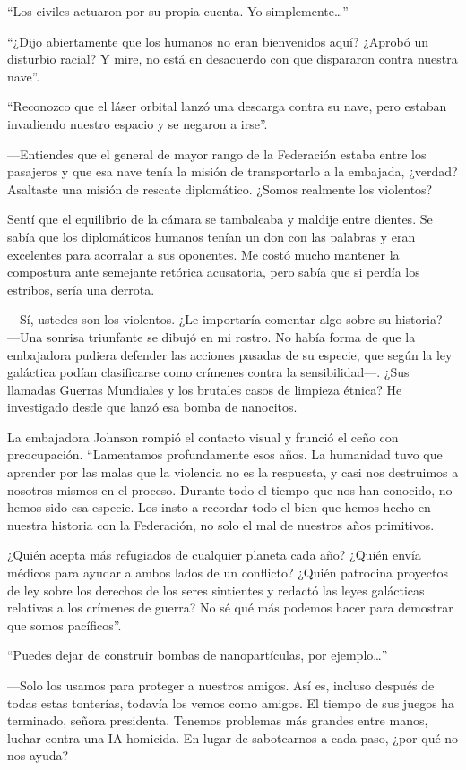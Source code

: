 ``Los civiles actuaron por su propia cuenta. Yo simplemente…''

``¿Dijo abiertamente que los humanos no eran bienvenidos aquí? ¿Aprobó un disturbio racial? Y mire, no está en desacuerdo con que dispararon contra nuestra nave''.

``Reconozco que el láser orbital lanzó una descarga contra su nave, pero estaban invadiendo nuestro espacio y se negaron a irse''.

—Entiendes que el general de mayor rango de la Federación estaba entre los pasajeros y que esa nave tenía la misión de transportarlo a la embajada, ¿verdad? Asaltaste una misión de rescate diplomático. ¿Somos realmente los violentos?

Sentí que el equilibrio de la cámara se tambaleaba y maldije entre dientes. Se sabía que los diplomáticos humanos tenían un don con las palabras y eran excelentes para acorralar a sus oponentes. Me costó mucho mantener la compostura ante semejante retórica acusatoria, pero sabía que si perdía los estribos, sería una derrota.

—Sí, ustedes son los violentos. ¿Le importaría comentar algo sobre su historia? —Una sonrisa triunfante se dibujó en mi rostro. No había forma de que la embajadora pudiera defender las acciones pasadas de su especie, que según la ley galáctica podían clasificarse como crímenes contra la sensibilidad—. ¿Sus llamadas Guerras Mundiales y los brutales casos de limpieza étnica? He investigado desde que lanzó esa bomba de nanocitos.

La embajadora Johnson rompió el contacto visual y frunció el ceño con preocupación. ``Lamentamos profundamente esos años. La humanidad tuvo que aprender por las malas que la violencia no es la respuesta, y casi nos destruimos a nosotros mismos en el proceso. Durante todo el tiempo que nos han conocido, no hemos sido esa especie. Los insto a recordar todo el bien que hemos hecho en nuestra historia con la Federación, no solo el mal de nuestros años primitivos.

¿Quién acepta más refugiados de cualquier planeta cada año? ¿Quién envía médicos para ayudar a ambos lados de un conflicto? ¿Quién patrocina proyectos de ley sobre los derechos de los seres sintientes y redactó las leyes galácticas relativas a los crímenes de guerra? No sé qué más podemos hacer para demostrar que somos pacíficos''.

``Puedes dejar de construir bombas de nanopartículas, por ejemplo…''

—Solo los usamos para proteger a nuestros amigos. Así es, incluso después de todas estas tonterías, todavía los vemos como amigos. El tiempo de sus juegos ha terminado, señora presidenta. Tenemos problemas más grandes entre manos, luchar contra una IA homicida. En lugar de sabotearnos a cada paso, ¿por qué no nos ayuda?

